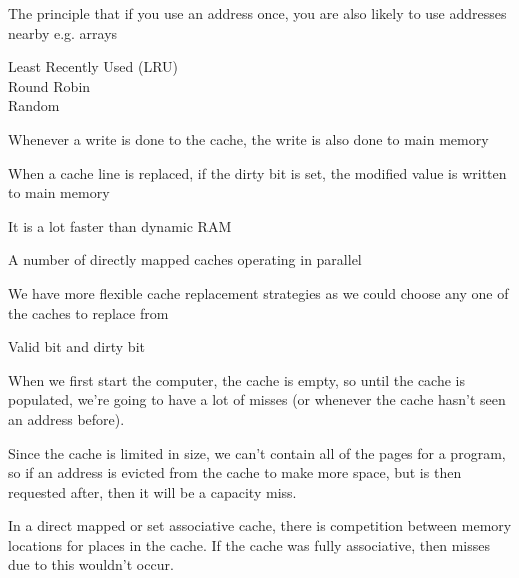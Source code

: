 


{
  The principle that if you use an address once, you are also likely to use addresses nearby e.g. arrays
}

{
  Least Recently Used (LRU)\\
  Round Robin\\
  Random
}

{
  Whenever a write is done to the cache, the write is also done to main memory
}

{
  When a cache line is replaced, if the dirty bit is set, the modified value is written to main memory
}

{
  It is a lot faster than dynamic RAM
}


{
  A number of directly mapped caches operating in parallel
}

{
  We have more flexible cache replacement strategies as we could choose any one of the caches to replace from
}

{
  Valid bit and dirty bit
}

{
  When we first start the computer, the cache is empty, so until the cache is populated, we're going to have a lot of misses (or whenever the cache hasn't seen an address before).
}

{
  Since the cache is limited in size, we can’t contain all of the pages for a program, so if an address is evicted from the cache to make more space, but is then requested after, then it will be a capacity miss.
}

{
  In a direct mapped or set associative cache, there is competition between memory locations for places in the cache. If the cache was fully associative, then misses due to this wouldn’t occur.
}